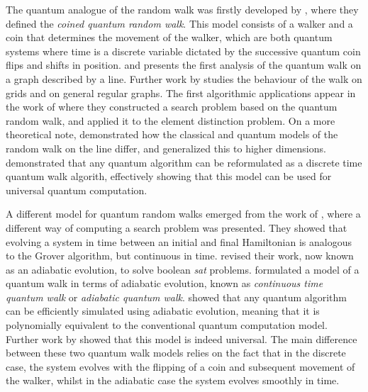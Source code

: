 \documentclass[../../dissertation.tex]{subfiles}
\begin{document}
The quantum analogue of the random walk was firstly developed by
\cite{aharonov1993}, where they defined the \textit{coined quantum random
walk}.  This model consists of a walker and a coin that determines the movement
of the walker, which are both quantum systems where time is a discrete variable
dictated by the successive quantum coin flips and shifts in position.
\cite{nayak2000} and \cite{aharonov2002}  presents the first analysis of the
quantum walk on a graph described by a line. Further work by \cite{inui2003}
studies the behaviour of the walk on grids and \cite{aharonov2002} on general
regular graphs. The first algorithmic applications appear in the work of
\cite{shenvi2002} where they constructed a search problem based on the quantum
random walk, and \cite{ambainis2003} applied it to the element distinction
problem. On a more theoretical note, \cite{konno2002} demonstrated how the
classical and quantum models of the random walk on the line differ, and
\cite{grimmett2003} generalized this to higher dimensions. \cite{lovett2010} demonstrated
that any quantum algorithm can be reformulated as a discrete time quantum walk
algorith, effectively showing that this model can be used for universal quantum
computation.\par

A different model for quantum random walks emerged from the work of
\cite{farhi1996}, where a different way of computing a search problem was
presented. They showed that evolving a system in time between an initial and
final Hamiltonian is analogous to the Grover algorithm, but continuous in time.
\cite{farhi2000} revised their work, now known as an adiabatic evolution, to
solve boolean \textit{sat} problems. \cite{childs2004} formulated a model of a
quantum walk in terms of adiabatic evolution, known as \textit{continuous time
quantum walk} or \textit{adiabatic quantum walk}. \cite{aharonov2005} showed
that any quantum algorithm can be efficiently simulated using adiabatic
evolution, meaning that it is polynomially equivalent to the conventional
quantum computation model. Further work by \cite{childs2009} showed that this
model is indeed universal. The main difference between these two quantum walk
models relies on the fact that in the discrete case, the system evolves with
the flipping of a coin and subsequent movement of the walker, whilst in the
adiabatic case the system evolves smoothly in time.\par 
\end{document}
